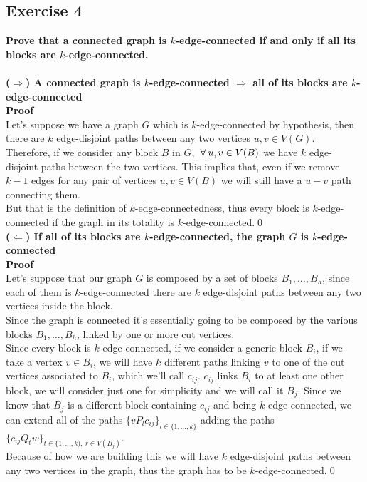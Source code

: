\subsection*{Exercise 4}
\textbf{Prove that a connected graph is $k$-edge-connected if and only if all its blocks are $k$-edge-connected.\\}
\\\linebreak
\textbf{($\Rightarrow$) A connected graph is $k$-edge-connected $\Rightarrow$ all of its blocks are $k$-edge-connected \\\linebreak Proof\\}
\unboldmath
Let's suppose we have a graph $G$ which is $k$-edge-connected by hypothesis, then there are $k$ edge-disjoint paths between any two vertices $u, v \in V(G)$.\\
Therefore, if we consider any block $B$ in $G$, $\:\forall\: u, v \in V(B)$ we have $k$ edge-disjoint paths between the two vertices. This implies that, even if we remove $k - 1$ edges for any pair of vertices $u, v \in V(B)$ we will still have a $u - v$ path connecting them.\\\linebreak
But that is the definition of $k$-edge-connectedness, thus every block is $k$-edge-connected if the graph in its totality is $k$-edge-connected.\qed\\\linebreak
\boldmath
\textbf{($\Leftarrow$) If all of its blocks are $k$-edge-connected, the graph $G$ is $k$-edge-connected\\\linebreak Proof\\}
\unboldmath
Let's suppose that our graph $G$ is composed by a set of blocks $B_1, \dots, B_h$, since each of them is $k$-edge-connected there are $k$ edge-disjoint paths between any two vertices inside the block.\\
Since the graph is connected it's essentially going to be composed by the various blocks $B_1, \dots, B_h$, linked by one or more cut vertices.\\\linebreak
Since every block is $k$-edge-connected, if we consider a generic block $B_i$, if we take a vertex $v \in B_i$, we will have $k$ different paths linking $v$ to one of the cut vertices associated to $B_i$, which we'll call $c_{ij}$.
$c_{ij}$ links $B_i$ to at least one other block, we will consider just one for simplicity and we will call it $B_j$. Since we know that $B_j$ is a different block containing $c_{ij}$ and being $k$-edge connected, we can extend all of the paths $\{vP_lc_{ij}\}_{l \in \{1, \dots, k\}}$ adding the paths $\{c_{ij}Q_tw\}_{t \in \{1, \dots, k),\: r \in V(B_j)}$.\\\linebreak
Because of how we are building this we will have $k$ edge-disjoint paths between any two vertices in the graph, thus the graph has to be $k$-edge-connected.\qed